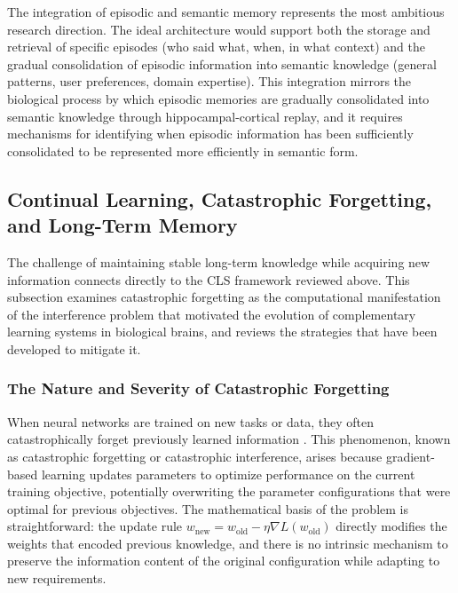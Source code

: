The integration of episodic and semantic memory represents the most ambitious research direction. The ideal architecture would support both the storage and retrieval of specific episodes (who said what, when, in what context) and the gradual consolidation of episodic information into semantic knowledge (general patterns, user preferences, domain expertise). This integration mirrors the biological process by which episodic memories are gradually consolidated into semantic knowledge through hippocampal-cortical replay, and it requires mechanisms for identifying when episodic information has been sufficiently consolidated to be represented more efficiently in semantic form.

\subsection{Continual Learning, Catastrophic Forgetting, and Long-Term Memory}

The challenge of maintaining stable long-term knowledge while acquiring new information connects directly to the CLS framework reviewed above. This subsection examines catastrophic forgetting as the computational manifestation of the interference problem that motivated the evolution of complementary learning systems in biological brains, and reviews the strategies that have been developed to mitigate it.

\subsubsection{The Nature and Severity of Catastrophic Forgetting}

When neural networks are trained on new tasks or data, they often catastrophically forget previously learned information \citep{luo2023empirical}. This phenomenon, known as catastrophic forgetting or catastrophic interference, arises because gradient-based learning updates parameters to optimize performance on the current training objective, potentially overwriting the parameter configurations that were optimal for previous objectives. The mathematical basis of the problem is straightforward: the update rule $w_{\text{new}} = w_{\text{old}} - \eta \nabla L(w_{\text{old}})$ directly modifies the weights that encoded previous knowledge, and there is no intrinsic mechanism to preserve the information content of the original configuration while adapting to new requirements.

